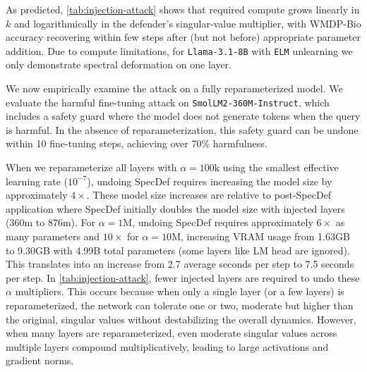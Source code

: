 \documentclass{article}
\theoremstyle{plain}
\theoremstyle{definition}
\theoremstyle{remark}
\begin{document}
As predicted, \cref{tab:injection-attack} shows that required compute grows linearly in $k$ and logarithmically in the defender's singular-value multiplier, with WMDP-Bio accuracy recovering within few steps after (but not before) appropriate parameter addition. Due to compute limitations, for \texttt{Llama-3.1-8B} with \texttt{ELM} unlearning we only demonstrate spectral deformation on one layer.

We now empirically examine the attack on a fully reparameterized model. We evaluate the harmful fine-tuning attack on \texttt{SmolLM2-360M-Instruct}, which includes a safety guard where the model does not generate tokens when the query is harmful. In the absence of reparameterization, this safety guard can be undone within 10 fine-tuning steps, achieving over 70\% harmfulness.

When we reparameterize all layers with $\alpha = 100\text{k}$ using the smallest effective learning rate ($10^{-7}$), undoing SpecDef requires increasing the model size by approximately $4\times$. These model size increases are relative to post-SpecDef application where SpecDef initially doubles the model size with injected layers (360m to 876m). For $\alpha = 1\text{M}$, undoing SpecDef requires approximately $6\times$ as many parameters and $10\times$ for $\alpha=10\text{M}$, increasing VRAM usage from 1.63GB to 9.30GB with 4.99B total parameters (some layers like LM head are ignored). This translates into an increase from 2.7 average seconds per step to 7.5 seconds per step. In \cref{tab:injection-attack}, fewer injected layers are required to undo these $\alpha$ multipliers. This occurs because when only a single layer (or a few layers) is reparameterized, the network can tolerate one or two, moderate but higher than the original, singular values without destabilizing the overall dynamics. However, when many layers are reparameterized, even moderate singular values across multiple layers compound multiplicatively, leading to large activations and  gradient norms.
\end{document}
